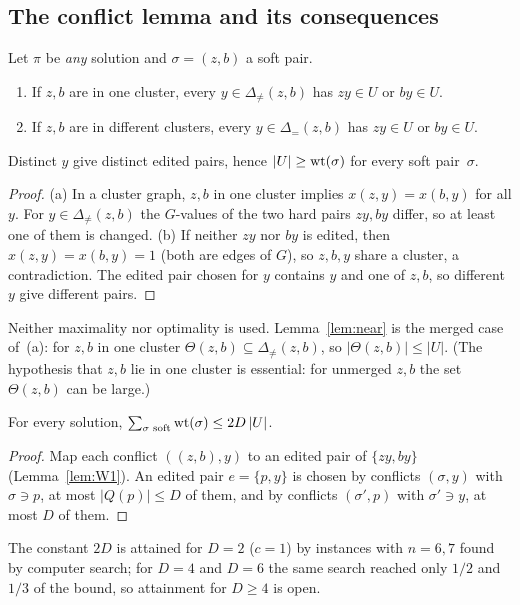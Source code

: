 \subsection{The conflict lemma and its consequences}
\begin{lemma}[W1: conflicts]\label{lem:W1}
Let $\pi$ be \emph{any} solution and $\sigma=(z,b)$ a soft pair.
\begin{enumerate}
\item[(a)] If $z,b$ are in one cluster, every $y\in\Delta_{\neq}(z,b)$ has $zy\in U$ or $by\in U$.
\item[(b)] If $z,b$ are in different clusters, every $y\in\Delta_{=}(z,b)$ has $zy\in U$ or $by\in U$.
\end{enumerate}
Distinct $y$ give distinct edited pairs, hence $|U|\ge \mathrm{wt}(\sigma)$ for every soft pair~$\sigma$.
\end{lemma}
\begin{proof}
(a) In a cluster graph, $z,b$ in one cluster implies $x(z,y)=x(b,y)$ for all $y$. For $y\in\Delta_{\neq}(z,b)$ the $G$-values of the two hard pairs $zy,by$ differ, so at least one of them is changed. (b) If neither $zy$ nor $by$ is edited, then $x(z,y)=x(b,y)=1$ (both are edges of $G$), so $z,b,y$ share a cluster, a contradiction. The edited pair chosen for $y$ contains $y$ and one of $z,b$, so different $y$ give different pairs.
\end{proof}
Neither maximality nor optimality is used. Lemma~\ref{lem:near} is the merged case of~(a): for $z,b$ in one cluster $\Theta(z,b)\subseteq\Delta_{\neq}(z,b)$, so $|\Theta(z,b)|\le|U|$. (The hypothesis that $z,b$ lie in one cluster is essential: for unmerged $z,b$ the set $\Theta(z,b)$ can be large.)

\begin{lemma}\label{lem:W2}
For every solution, $\sum_{\sigma\text{ soft}}\mathrm{wt}(\sigma)\le2D\,|U|$.
\end{lemma}
\begin{proof}
Map each conflict $((z,b),y)$ to an edited pair of $\{zy,by\}$ (Lemma~\ref{lem:W1}). An edited pair $e=\{p,y\}$ is chosen by conflicts $(\sigma,y)$ with $\sigma\ni p$, at most $|Q(p)|\le D$ of them, and by conflicts $(\sigma',p)$ with $\sigma'\ni y$, at most $D$ of them.
\end{proof}
The constant $2D$ is attained for $D=2$ ($c=1$) by instances with $n=6,7$ found by computer search; for $D=4$ and $D=6$ the same search reached only $1/2$ and $1/3$ of the bound, so attainment for $D\ge4$ is open.

